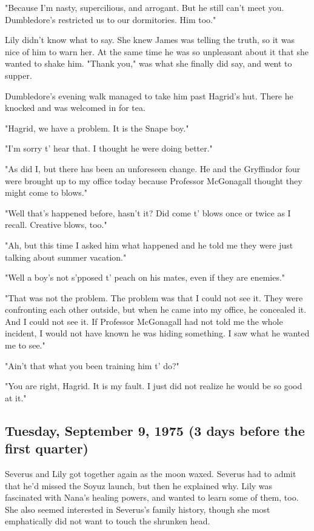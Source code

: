 \documentclass[a4paper,11pt]{article}
\begin{document}
"Because I'm nasty, supercilious, and arrogant. But he still can't meet you. Dumbledore's restricted us to our dormitories. Him too."

Lily didn't know what to say. She knew James was telling the truth, so it was nice of him to warn her. At the same time he was so unpleasant about it that she wanted to shake him. "Thank you," was what she finally did say, and went to supper.

Dumbledore's evening walk managed to take him past Hagrid's hut. There he knocked and was welcomed in for tea.

"Hagrid, we have a problem. It is the Snape boy."

"I'm sorry t' hear that. I thought he were doing better."

"As did I, but there has been an unforeseen change. He and the Gryffindor four were brought up to my office today because Professor McGonagall thought they might come to blows."

"Well that's happened before, hasn't it? Did come t' blows once or twice as I recall. Creative blows, too."

"Ah, but this time I asked him what happened and he told me they were just talking about summer vacation."

"Well a boy's not s'pposed t' peach on his mates, even if they are enemies."

"That was not the problem. The problem was that I could not see it. They were confronting each other outside, but when he came into my office, he concealed it. And I could not see it. If Professor McGonagall had not told me the whole incident, I would not have known he was hiding something. I saw what he wanted me to see."

"Ain't that what you been training him t' do?"

"You are right, Hagrid. It is my fault. I just did not realize he would be so good at it."

\subsection{Tuesday, September 9, 1975 (3 days before the first quarter)}

Severus and Lily got together again as the moon waxed. Severus had to admit that he'd missed the Soyuz launch, but then he explained why. Lily was fascinated with Nana's healing powers, and wanted to learn some of them, too. She also seemed interested in Severus's family history, though she most emphatically did not want to touch the shrunken head.
\end{document}
